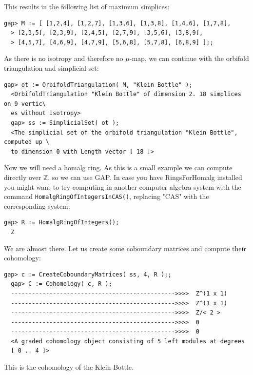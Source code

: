 \documentclass[a4paper,11pt]{report}
\begin{document}
{{ This results in the following list of maximum simplices: 
\begin{Verbatim}[fontsize=\small,frame=single,label=Example]
  gap> M := [ [1,2,4], [1,2,7], [1,3,6], [1,3,8], [1,4,6], [1,7,8],
  > [2,3,5], [2,3,9], [2,4,5], [2,7,9], [3,5,6], [3,8,9],
  > [4,5,7], [4,6,9], [4,7,9], [5,6,8], [5,7,8], [6,8,9] ];;
\end{Verbatim}
 As there is no isotropy and therefore no $\mu$-map, we can continue with the orbifold triangulation and simplicial set: 
\begin{Verbatim}[fontsize=\small,frame=single,label=Example]
  gap> ot := OrbifoldTriangulation( M, "Klein Bottle" );
  <OrbifoldTriangulation "Klein Bottle" of dimension 2. 18 simplices on 9 vertic\
  es without Isotropy>
  gap> ss := SimplicialSet( ot );
  <The simplicial set of the orbifold triangulation "Klein Bottle", computed up \
  to dimension 0 with Length vector [ 18 ]>
\end{Verbatim}
 Now we will need a \textsf{homalg} ring. As this is a small example we can compute directly over
{\ensuremath{\mathbb Z}}, so we can use \textsf{GAP}. In case you have \textsf{RingsForHomalg} installed you might want to try computing in another computer algebra system
with the command \texttt{HomalgRingOfIntegersInCAS()}, replacing "CAS" with the corresponding system. 
\begin{Verbatim}[fontsize=\small,frame=single,label=Example]
  gap> R := HomalgRingOfIntegers();
  Z
\end{Verbatim}
 We are almost there. Let us create some coboundary matrices and compute their
cohomology: 
\begin{Verbatim}[fontsize=\small,frame=single,label=Example]
  gap> c := CreateCoboundaryMatrices( ss, 4, R );;
  gap> C := Cohomology( c, R );
  ----------------------------------------------->>>>  Z^(1 x 1)
  ----------------------------------------------->>>>  Z^(1 x 1)
  ----------------------------------------------->>>>  Z/< 2 >
  ----------------------------------------------->>>>  0
  ----------------------------------------------->>>>  0
  <A graded cohomology object consisting of 5 left modules at degrees
  [ 0 .. 4 ]>
\end{Verbatim}
 This is the cohomology of the Klein Bottle. }

 
}
\end{document}
